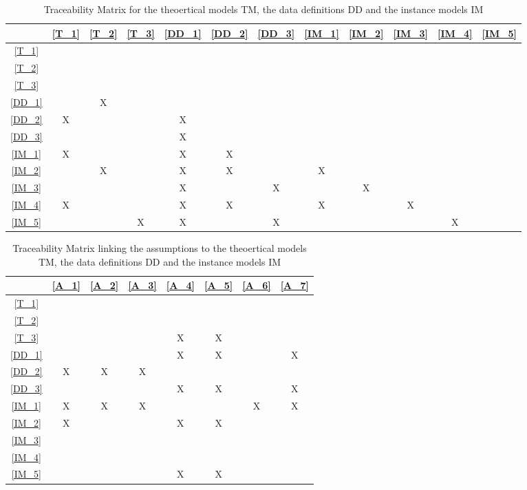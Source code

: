\documentclass[12pt]{article}
\begin{document}
\begin{table}[H]
\centering
\begin{tabular}{|c|c|c|c|c|c|c|c|c|c|c|c|}
\hline
	& \cref{T_1} & \cref{T_2} & \cref{T_3} & \cref{DD_1} & \cref{DD_2} & \cref{DD_3} & \cref{IM_1} & \cref{IM_2} & \cref{IM_3} & \cref{IM_4} & \cref{IM_5} \\
\hline
\cref{T_1}			& \cellcolor{gray!25} & & & & & & & & & & \\ \hline
\cref{T_2}			& & \cellcolor{gray!25} & & & & & & & & & \\ \hline
\cref{T_3}			& & & \cellcolor{gray!25} & & & & & & & & \\ \hline
\cref{DD_1}			& & X & & \cellcolor{gray!25} & & & & & & & \\ \hline
\cref{DD_2}			& X & & & X & \cellcolor{gray!25} & & & & & & \\ \hline
\cref{DD_3}			& & & & X & & \cellcolor{gray!25} & & & & & \\ \hline
\cref{IM_1}			& X & & & X & X & & \cellcolor{gray!25} & & & & \\ \hline
\cref{IM_2}			& & X & & X & X & & X & \cellcolor{gray!25} & & & \\ \hline
\cref{IM_3}			& & & & X & & X & & X & \cellcolor{gray!25} & & \\ \hline
\cref{IM_4}			& X & & & X & X & & X & & X & \cellcolor{gray!25} & \\ \hline
\cref{IM_5}			& & & X & X & & X & & & & X & \cellcolor{gray!25} \\ \hline
\end{tabular}
\caption{Traceability Matrix for the theoertical models TM, the data definitions DD and the instance models IM}\label{tb:Matrix_1}
\end{table}

\begin{table}[H]
\centering
\begin{tabular}{|c|c|c|c|c|c|c|c|}
\hline
	& \cref{A_1} & \cref{A_2} & \cref{A_3} & \cref{A_4} & \cref{A_5} & \cref{A_6} & \cref{A_7} \\
\hline
\cref{T_1}			& & & & & & & \\ \hline
\cref{T_2}			& & & & & & & \\ \hline
\cref{T_3}			& & & & X & X & & \\ \hline
\cref{DD_1}			& & & & X & X & & X \\ \hline
\cref{DD_2}			& X & X & X & & & & \\ \hline
\cref{DD_3}			& & & & X & X & & X \\ \hline
\cref{IM_1}			& X & X & X & & & X & X \\ \hline
\cref{IM_2}			& X & & & X & X & & \\ \hline
\cref{IM_3}			& & & & & & & \\ \hline
\cref{IM_4}			& & & & & & & \\ \hline
\cref{IM_5}			& & & & X & X & & \\ \hline
\end{tabular}
\caption{Traceability Matrix linking the assumptions to the theoertical models TM, the data definitions DD and the instance models IM}\label{tb:Matrix_2}
\end{table}
\end{document}
